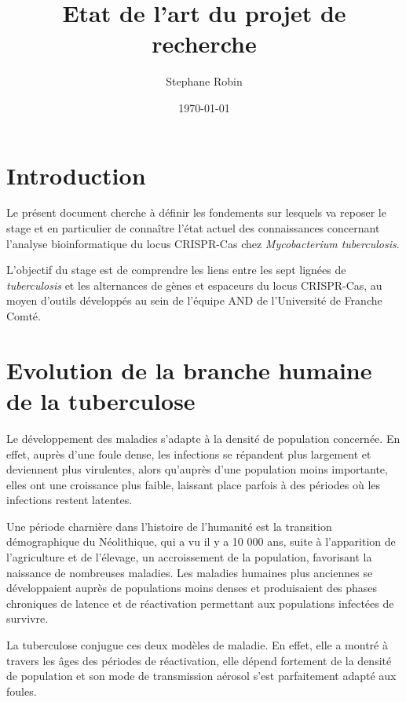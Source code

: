 \documentclass[twoside,a4paper,11pt,frenchb,openany]{report}
\title{Etat de l'art du projet de recherche}
\author{Stephane Robin}
\date{\today}
\begin{document}
\maketitle

\section{Introduction}

Le présent document cherche à définir les fondements sur lesquels va reposer le stage et en particulier de connaître l'état actuel des connaissances concernant l'analyse bioinformatique du locus CRISPR-Cas chez \textit{Mycobacterium tuberculosis}.

L'objectif du stage est de comprendre les liens entre les sept lignées de \textit{tuberculosis} et les alternances de gènes et espaceurs du locus CRISPR-Cas, au moyen d'outils développés au sein de l'équipe AND de l'Université de Franche Comté.



\section{Evolution de la branche humaine de la tuberculose}

Le développement des maladies s'adapte à la densité de population concernée. En effet, auprès d'une foule dense, les infections se répandent plus largement et deviennent plus virulentes, alors qu'auprès d'une population moins importante, elles ont une croissance plus faible, laissant place parfois à des périodes où les infections restent latentes.

Une période charnière dans l'histoire de l'humanité est la transition démographique du Néolithique, qui a vu il y a 10 000 ans, suite à l'apparition de l'agriculture et de l'élevage, un accroissement de la population, favorisant la naissance de nombreuses maladies. Les maladies humaines plus anciennes se développaient auprès de populations moins denses et produisaient des phases chroniques de latence et de réactivation permettant aux populations infectées de survivre.

La tuberculose conjugue ces deux modèles de maladie. En effet, elle a montré à travers les âges des périodes de réactivation, elle dépend fortement de la densité de population et son mode de transmission aérosol s'est parfaitement adapté aux foules.

\end{document}

